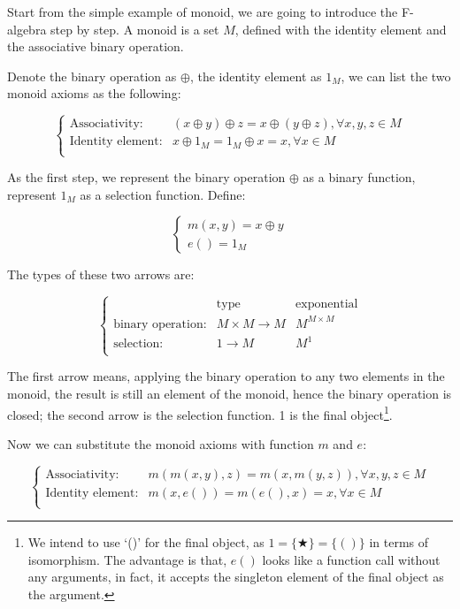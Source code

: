 \documentclass{article}
\begin{document}
\begin{example}
\normalfont
Start from the simple example of monoid, we are going to introduce the F-algebra step by step. A monoid is a set $M$, defined with the identity element and the associative binary operation.

Denote the binary operation as $\oplus$, the identity element as $1_M$, we can list the two monoid axioms as the following:

\[
\begin{cases}
\text{Associativity:} & (x \oplus y) \oplus z = x \oplus (y \oplus z), \forall x, y, z \in M \\
\text{Identity element:} & x \oplus 1_M = 1_M \oplus x = x, \forall x \in M \\
\end{cases}
\]

As the first step, we represent the binary operation $\oplus$ as a binary function, represent $1_M$ as a selection function. Define:

\[
\begin{cases}
m (x, y) = x \oplus y \\
e () = 1_M
\end{cases}
\]

The types of these two arrows are:

\[
\left \{
\begin{array}{lll}
 & \text{type} & \text{exponential} \\
\text{binary operation:} & M \times M \to M & M^{M \times M}\\
\text{selection:} & 1 \to M & M^1 \\
\end{array}
\right .
\]

The first arrow means, applying the binary operation to any two elements in the monoid, the result is still an element of the monoid, hence the binary operation is closed; the second arrow is the selection function. 1 is the final object\footnote{We intend to use `()' for the final object, as $1 = \{ \bigstar \} = \{ () \}$ in terms of isomorphism. The advantage is that, $e()$ looks like a function call without any arguments, in fact, it accepts the singleton element of the final object as the argument.}.

Now we can substitute the monoid axioms with function $m$ and $e$:

\[
\begin{cases}
\text{Associativity:} & m(m(x, y), z) = m(x, m(y, z)), \forall x, y, z \in M \\
\text{Identity element:} & m(x, e()) = m(e(), x) = x, \forall x \in M \\
\end{cases}
\]


\end{example}
\end{document}
